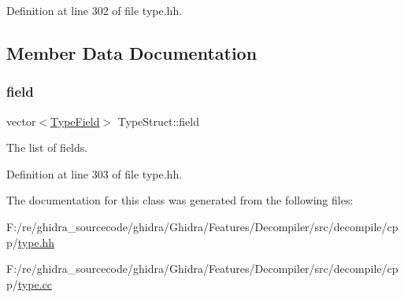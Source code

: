 Definition at line 302 of file type.\+hh.



\subsection{Member Data Documentation}
\mbox{\label{class_type_struct_a4d5a49b12324fb588f6c1631c35bc37d}} 
\subsubsection{\texorpdfstring{field}{field}}
{\footnotesize\ttfamily vector$<$\mbox{\hyperlink{struct_type_field}{Type\+Field}}$>$ Type\+Struct\+::field\hspace{0.3cm}{\ttfamily [protected]}}



The list of fields. 



Definition at line 303 of file type.\+hh.



The documentation for this class was generated from the following files\+:\begin{DoxyCompactItemize}
\item 
F\+:/re/ghidra\+\_\+sourcecode/ghidra/\+Ghidra/\+Features/\+Decompiler/src/decompile/cpp/\mbox{\hyperlink{type_8hh}{type.\+hh}}\item 
F\+:/re/ghidra\+\_\+sourcecode/ghidra/\+Ghidra/\+Features/\+Decompiler/src/decompile/cpp/\mbox{\hyperlink{type_8cc}{type.\+cc}}\end{DoxyCompactItemize}
